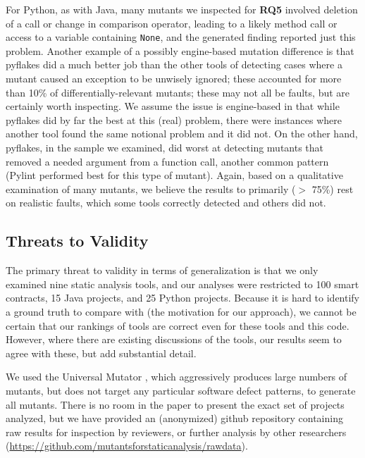 For Python, as with Java, many mutants we inspected for {\bf RQ5} involved deletion of a call or change in comparison operator, leading to a likely method call or access to a variable containing {\tt None}, and the generated finding reported just this problem.  Another example of a possibly engine-based mutation difference is that pyflakes did a much better job than the other tools of detecting cases where a mutant caused an exception to be unwisely ignored; these accounted for more than 10\% of differentially-relevant mutants; these may not all be faults, but are certainly worth inspecting.  We assume the issue is engine-based in that while pyflakes did by far the best at this (real) problem, there were instances where another tool found the same notional problem and it did not.  On the other hand, pyflakes, in the sample we examined, did worst at detecting mutants that removed a needed argument from a function call, another common pattern (Pylint performed best for this type of mutant).  Again, based on a qualitative examination of many mutants, we believe the results to primarily ($>$ 75\%) rest on realistic faults, which some tools correctly detected and others did not.

\subsection{Threats to Validity}

The primary threat to validity in terms of generalization is that we only examined nine static analysis tools, and our analyses were restricted to 100 smart contracts, 15 Java projects, and 25 Python projects.   Because it is hard to identify a ground truth to compare with (the motivation for our approach), we cannot be certain that our rankings of tools are correct even for these tools and this code.  However, where there are existing discussions of the tools, our results seem to agree with these, but add substantial detail.

We used the Universal Mutator \cite{universalmutator,regexpMut}, which aggressively produces large numbers of mutants, but does not target any particular software defect patterns, to generate all mutants.
There is no room in the paper to present the exact set of projects analyzed, but we have provided an (anonymized) github repository containing raw results for inspection by reviewers, or further analysis by other researchers (\url{https://github.com/mutantsforstaticanalysis/rawdata}).